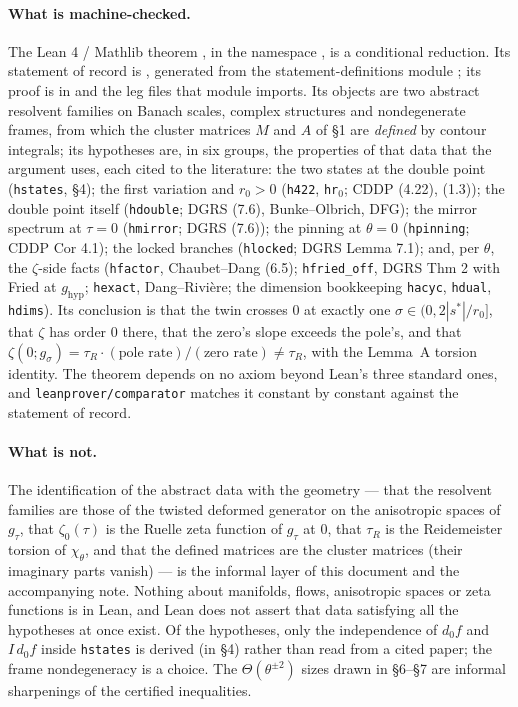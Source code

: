 \documentclass[11pt]{article}
\begin{document}
\paragraph{What is machine-checked.} The Lean 4 / Mathlib theorem
, in the namespace , is a
conditional reduction. Its statement of record is , generated from the
statement-definitions module ; its proof is in
 and the leg files that module imports. Its objects are two abstract resolvent families on Banach scales, complex structures
and nondegenerate frames, from which the cluster matrices $M$ and $A$ of \S1 are \emph{defined}
by contour integrals; its hypotheses are, in six groups, the properties of that data that the
argument uses, each cited to the literature: the two states at the double point
(\texttt{hstates}, \S4); the first variation and $r_0 > 0$ (\texttt{h422}, \texttt{hr}$_0$; CDDP
(4.22), (1.3)); the double point itself (\texttt{hdouble}; DGRS (7.6), Bunke--Olbrich, DFG); the
mirror spectrum at $\tau = 0$ (\texttt{hmirror}; DGRS (7.6)); the pinning at $\theta = 0$
(\texttt{hpinning}; CDDP Cor 4.1); the locked branches (\texttt{hlocked}; DGRS Lemma 7.1); and,
per $\theta$, the $\zeta$-side facts (\texttt{hfactor}, Chaubet--Dang (6.5); \texttt{hfried\_off},
DGRS Thm 2 with Fried at $g_{\mathrm{hyp}}$; \texttt{hexact}, Dang--Rivi\`ere; the dimension
bookkeeping \texttt{hacyc}, \texttt{hdual}, \texttt{hdims}). Its conclusion is that the twin
crosses $0$ at exactly one $\sigma \in (0, 2|s^*|/r_0]$, that $\zeta$ has order $0$ there, that
the zero's slope exceeds the pole's, and that
$\zeta(0; g_\sigma) = \tau_R\cdot(\text{pole rate})/(\text{zero rate}) \neq \tau_R$, with the
Lemma~A torsion identity. The theorem depends on no axiom beyond Lean's three standard ones, and
\texttt{leanprover/comparator} matches it constant by constant against the statement of record.

\paragraph{What is not.} The identification of the abstract data with the geometry --- that the
resolvent families are those of the twisted deformed generator on the anisotropic spaces of
$g_\tau$, that $\zeta_0(\tau)$ is the Ruelle zeta function of $g_\tau$ at $0$, that $\tau_R$ is
the Reidemeister torsion of $\chi_\theta$, and that the defined matrices are the cluster matrices
(their imaginary parts vanish) --- is the informal layer of this document and the accompanying
note. Nothing about manifolds, flows, anisotropic spaces or zeta functions is in Lean, and Lean
does not assert that data satisfying all the hypotheses at once exist. Of the hypotheses, only
the independence of $d_0 f$ and $I\,d_0 f$ inside \texttt{hstates} is derived (in \S4) rather
than read from a cited paper; the frame nondegeneracy is a choice. The $\Theta(\theta^{\pm 2})$
sizes drawn in \S6--\S7 are informal sharpenings of the certified inequalities.
\end{document}
